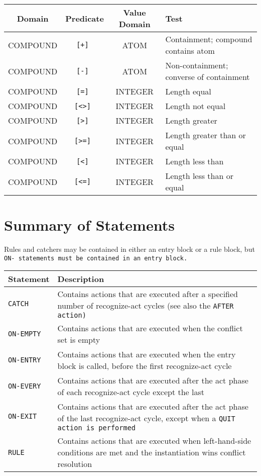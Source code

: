 \begin{tabularx}{\columnwidth}{cccX}
  \toprule
  Domain & Predicate & Value Domain & Test \\
  \midrule
  COMPOUND & \tt{[+]} & ATOM & Containment; compound contains atom \\
  COMPOUND & \tt{[-]} & ATOM & Non-containment; converse of containment \\
  COMPOUND & \tt{[=]} & INTEGER & Length equal \\
  COMPOUND & \tt{[<>]} & INTEGER & Length not equal \\
  COMPOUND & \tt{[>]} & INTEGER & Length greater \\
  COMPOUND & \tt{[>=]} & INTEGER & Length greater than or  equal \\
  COMPOUND & \tt{[<]}  & INTEGER & Length less than \\
  COMPOUND & \tt{[<=]} & INTEGER & Length less than or equal \\
  \bottomrule
\end{tabularx}

\section{Summary of Statements}

Rules and catchers may be contained in either an entry block or a
rule block, but \tt{ON-} statements must be contained in an entry
block.

\begin{tabularx}{\columnwidth}{lX}
  \toprule
  Statement & Description \\
  \midrule
  \tt{CATCH} & Contains actions that are executed after a 
               specified number of recognize-act cycles (see    
               also the \tt{AFTER} action) \\
  \tt{ON-EMPTY} & Contains actions that are executed when the
                  conflict set is empty \\
  \tt{ON-ENTRY} & Contains actions that are executed when the entry
                  block is called, before the first recognize-act
                  cycle \\
    \tt{ON-EVERY} & Contains actions that are executed after the act 
                    phase of each recognize-act cycle except the last  \\
  \tt{ON-EXIT} &  Contains actions that are executed after the act 
                 phase of the last recognize-act cycle, except    
                 when a \tt{QUIT} action is performed \\
  \tt{RULE} & Contains actions that are executed when 
              left-hand-side conditions are met and the 
              instantiation wins conflict resolution \\
  \bottomrule
\end{tabularx}


